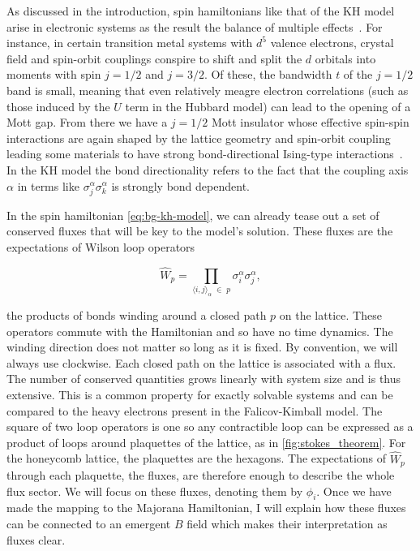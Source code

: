 As discussed in the introduction, spin hamiltonians like that of the KH model arise in electronic systems as the result the balance of multiple effects~\autocite{TrebstPhysRep2022}. For instance, in certain transition metal systems with \(d^5\) valence electrons, crystal field and spin-orbit couplings conspire to shift and split the \(d\) orbitals into moments with spin \(j = 1/2\) and \(j = 3/2\). Of these, the bandwidth \(t\) of the \(j= 1/2\) band is small, meaning that even relatively meagre electron correlations (such as those induced by the \(U\) term in the Hubbard model) can lead to the opening of a Mott gap. From there we have a \(j = 1/2\) Mott insulator whose effective spin-spin interactions are again shaped by the lattice geometry and spin-orbit coupling leading some materials to have strong bond-directional Ising-type interactions~\autocite{jackeliMottInsulatorsStrong2009,khaliullinOrbitalOrderFluctuations2005}. In the KH model the bond directionality refers to the fact that the coupling axis \(\alpha\) in terms like \(\sigma_j^{\alpha}\sigma_k^{\alpha}\) is strongly bond dependent.

In the spin hamiltonian \cref{eq:bg-kh-model}, we can already tease out a set of conserved fluxes that will be key to the model's solution. These fluxes are the expectations of Wilson loop operators

\[\hat{W}_p = \prod_{\langle i,j\rangle_\alpha\; \in\; p} \sigma_i^{\alpha}\sigma_j^{\alpha},\]

the products of bonds winding around a closed path \(p\) on the lattice. These operators commute with the Hamiltonian and so have no time dynamics. The winding direction does not matter so long as it is fixed. By convention, we will always use clockwise. Each closed path on the lattice is associated with a flux. The number of conserved quantities grows linearly with system size and is thus extensive. This is a common property for exactly solvable systems and can be compared to the heavy electrons present in the Falicov-Kimball model. The square of two loop operators is one so any contractible loop can be expressed as a product of loops around plaquettes of the lattice, as in \cref{fig:stokes_theorem}. For the honeycomb lattice, the plaquettes are the hexagons. The expectations of \(\hat{W}_p\) through each plaquette, the fluxes, are therefore enough to describe the whole flux sector. We will focus on these fluxes, denoting them by \(\phi_i\). Once we have made the mapping to the Majorana Hamiltonian, I will explain how these fluxes can be connected to an emergent \(B\) field which makes their interpretation as fluxes clear.

